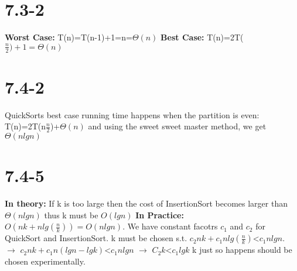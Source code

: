 \documentclass[12pt]{article}
\begin{document}
\section{7.3-2}
\textbf{Worst Case:} T(n)=T(n-1)+1=n=$\Theta(n)$ \newline
\textbf{Best Case:} T(n)=2T($\frac{n}{2})+1=\Theta(n)$

\section{7.4-2}
QuickSorts best case running time happens when the partition is even: T(n)=2T(n$\frac{n}{2}$)+$\Theta(n)$ and using the sweet sweet master method, we get $\Theta(nlgn)$

\section{7.4-5}
\textbf{In theory:} If k is too large then the cost of InsertionSort becomes larger than $\Theta(nlgn)$ thus k must be $O(lgn)$ \newline
\textbf{In Practice:} $O(nk+nlg(\frac{n}{k}))=O(nlgn)$. We have constant facotrs $c_1$ and $c_2$ for QuickSort and InsertionSort. k must be chosen s.t. $c_2nk+c_1nlg(\frac{n}{k})$<$c_1nlgn$.\newline
$\rightarrow$ $c_2nk+c_1n(lgn-lgk)$<$c_1nlgn$ \newline
$\rightarrow$ $C_2k$<$c_1lgk$ \newline
k just so happens should be chosen experimentally.
\end{document}
